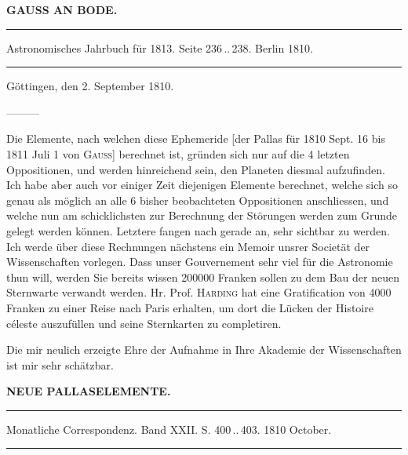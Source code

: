 \begin{center}\textbf{GAUSS AN BODE.}\par\vspace{4pt}\hrule\vspace{4pt}\fontsize{10}{12}\selectfont Astronomisches Jahrbuch für 1813. Seite 236\,..\,238. Berlin 1810.\par\vspace{4pt}\hrule\vspace{4pt}\end{center}
\begin{flushright}Göttingen, den 2. September 1810.\end{flushright}

\par\indent ---\enspace---\enspace---

\par\indent Die Elemente, nach welchen diese Ephemeride [der Pallas für 1810 Sept. 16 bis 1811 Juli 1 von \textsc{Gauss}] berechnet ist, gründen sich nur auf die 4 letzten Oppositionen, und werden hinreichend sein, den Planeten diesmal aufzufinden. Ich habe aber auch vor einiger Zeit diejenigen Elemente berechnet, welche sich so genau als möglich an alle 6 bisher beobachteten Oppositionen anschliessen, und welche nun am schicklichsten zur Berechnung der Störungen werden zum Grunde gelegt werden können. Letztere fangen nach gerade an, sehr sichtbar zu werden. Ich werde über diese Rechnungen nächstens ein Memoir unsrer Societät der Wissenschaften vorlegen. Dass unser Gouvernement sehr viel für die Astronomie thun will, werden Sie bereits wissen 200000 Franken sollen zu dem Bau der neuen Sternwarte verwandt werden. Hr. Prof. \textsc{Harding} hat eine Gratification von 4000 Franken zu einer Reise nach Paris erhalten, um dort die Lücken der Histoire céleste auszufüllen und seine Sternkarten zu completiren.

Die mir neulich erzeigte Ehre der Aufnahme in Ihre Akademie der Wissenschaften ist mir sehr schätzbar.
\clearpage{}

\begin{center}\textbf{NEUE PALLASELEMENTE.}\par\vspace{4pt}\hrule\vspace{4pt}\fontsize{10}{12}\selectfont Monatliche Correspondenz. Band XXII. S. 400\,..\,403. 1810 October.\par\vspace{4pt}\hrule\vspace{4pt}\end{center}

